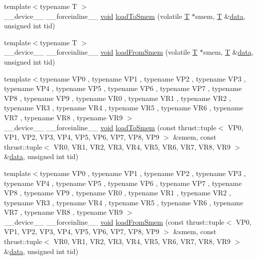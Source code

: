 \begin{DoxyCompactItemize}
\item 
{\footnotesize template$<$typename T $>$ }\\\-\_\-\-\_\-device\-\_\-\-\_\- \-\_\-\-\_\-forceinline\-\_\-\-\_\- \hyperlink{legacy_8hpp_a8bb47f092d473522721002c86c13b94e}{void} \hyperlink{namespacecv_1_1gpu_1_1device_1_1reduce__key__val__detail_a93640799801039059c028a536a7262c2}{load\-To\-Smem} (volatile \hyperlink{calib3d_8hpp_a3efb9551a871ddd0463079a808916717}{T} $\ast$smem, \hyperlink{calib3d_8hpp_a3efb9551a871ddd0463079a808916717}{T} \&\hyperlink{legacy_8hpp_ab9fe6c09e6d02865a953fffc12fe6ca0}{data}, unsigned int tid)
\item 
{\footnotesize template$<$typename T $>$ }\\\-\_\-\-\_\-device\-\_\-\-\_\- \-\_\-\-\_\-forceinline\-\_\-\-\_\- \hyperlink{legacy_8hpp_a8bb47f092d473522721002c86c13b94e}{void} \hyperlink{namespacecv_1_1gpu_1_1device_1_1reduce__key__val__detail_a27958ea2d44bafd5005beccd84c376ab}{load\-From\-Smem} (volatile \hyperlink{calib3d_8hpp_a3efb9551a871ddd0463079a808916717}{T} $\ast$smem, \hyperlink{calib3d_8hpp_a3efb9551a871ddd0463079a808916717}{T} \&\hyperlink{legacy_8hpp_ab9fe6c09e6d02865a953fffc12fe6ca0}{data}, unsigned int tid)
\item 
{\footnotesize template$<$typename V\-P0 , typename V\-P1 , typename V\-P2 , typename V\-P3 , typename V\-P4 , typename V\-P5 , typename V\-P6 , typename V\-P7 , typename V\-P8 , typename V\-P9 , typename V\-R0 , typename V\-R1 , typename V\-R2 , typename V\-R3 , typename V\-R4 , typename V\-R5 , typename V\-R6 , typename V\-R7 , typename V\-R8 , typename V\-R9 $>$ }\\\-\_\-\-\_\-device\-\_\-\-\_\- \-\_\-\-\_\-forceinline\-\_\-\-\_\- \hyperlink{legacy_8hpp_a8bb47f092d473522721002c86c13b94e}{void} \hyperlink{namespacecv_1_1gpu_1_1device_1_1reduce__key__val__detail_a7572f5e4022dee579a1288b2e1749a9f}{load\-To\-Smem} (const thrust\-::tuple$<$ V\-P0, V\-P1, V\-P2, V\-P3, V\-P4, V\-P5, V\-P6, V\-P7, V\-P8, V\-P9 $>$ \&smem, const thrust\-::tuple$<$ V\-R0, V\-R1, V\-R2, V\-R3, V\-R4, V\-R5, V\-R6, V\-R7, V\-R8, V\-R9 $>$ \&\hyperlink{legacy_8hpp_ab9fe6c09e6d02865a953fffc12fe6ca0}{data}, unsigned int tid)
\item 
{\footnotesize template$<$typename V\-P0 , typename V\-P1 , typename V\-P2 , typename V\-P3 , typename V\-P4 , typename V\-P5 , typename V\-P6 , typename V\-P7 , typename V\-P8 , typename V\-P9 , typename V\-R0 , typename V\-R1 , typename V\-R2 , typename V\-R3 , typename V\-R4 , typename V\-R5 , typename V\-R6 , typename V\-R7 , typename V\-R8 , typename V\-R9 $>$ }\\\-\_\-\-\_\-device\-\_\-\-\_\- \-\_\-\-\_\-forceinline\-\_\-\-\_\- \hyperlink{legacy_8hpp_a8bb47f092d473522721002c86c13b94e}{void} \hyperlink{namespacecv_1_1gpu_1_1device_1_1reduce__key__val__detail_a6bac7fcf29b3b1d0dab2d20a4b5eb5ec}{load\-From\-Smem} (const thrust\-::tuple$<$ V\-P0, V\-P1, V\-P2, V\-P3, V\-P4, V\-P5, V\-P6, V\-P7, V\-P8, V\-P9 $>$ \&smem, const thrust\-::tuple$<$ V\-R0, V\-R1, V\-R2, V\-R3, V\-R4, V\-R5, V\-R6, V\-R7, V\-R8, V\-R9 $>$ \&\hyperlink{legacy_8hpp_ab9fe6c09e6d02865a953fffc12fe6ca0}{data}, unsigned int tid)

\end{DoxyCompactItemize}
